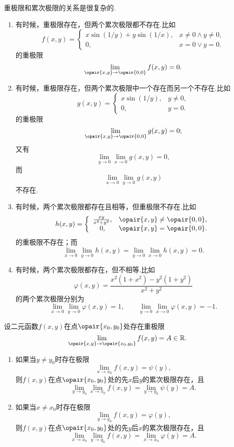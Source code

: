 \begin{example}
重极限和累次极限的关系是很复杂的.
\begin{enumerate}
\item 有时候，重极限存在，但两个累次极限都不存在.比如\[
f(x,y) = \left\{ \begin{array}{cl}
x \sin(1/y) + y \sin(1/x), & x\neq0 \land y\neq0, \\
0, & x=0 \lor y=0.
\end{array} \right.
\]的重极限\[
\lim\limits_{\opair{x,y}\to\opair{0,0}} f(x,y) = 0.
\]

\item 有时候，重极限存在，但两个累次极限中一个存在而另一个不存在.比如\[
g(x,y) = \left\{ \begin{array}{cl}
x \sin(1/y), & y\neq0, \\
0, & y=0.
\end{array} \right.
\]的重极限\[
\lim\limits_{\opair{x,y}\to\opair{0,0}} g(x,y) = 0;
\]又有\[
\lim\limits_{y\to0} \lim\limits_{x\to0} g(x,y) = 0,
\]而\[
\lim\limits_{x\to0} \lim\limits_{y\to0} g(x,y)
\]不存在.

\item 有时候，两个累次极限都存在且相等，但重极限不存在.比如\[
h(x,y) = \left\{ \begin{array}{cl}
\frac{xy}{x^2+y^2}, & \opair{x,y}\neq\opair{0,0}, \\
0, & \opair{x,y}=\opair{0,0}.
\end{array} \right.
\]的重极限不存在；而\[
\lim\limits_{x\to0} \lim\limits_{y\to0} h(x,y)
= \lim\limits_{y\to0} \lim\limits_{x\to0} h(x,y) = 0.
\]

\item 有时候，两个累次极限都存在，但不相等.比如\[
\varphi(x,y) = \frac{x^2(1+x^2) - y^2(1+y^2)}{x^2+y^2}
\]的两个累次极限分别为\[
\lim\limits_{x\to0} \lim\limits_{y\to0} \varphi(x,y) = 1,
\qquad
\lim\limits_{y\to0} \lim\limits_{x\to0} \varphi(x,y) = -1.
\]
\end{enumerate}
\end{example}

\begin{theorem}
设二元函数\(f(x,y)\)在点\(\opair{x_0,y_0}\)处存在重极限\[
\lim\limits_{\opair{x,y}\to\opair{x_0,y_0}} f(x,y) = A \in \mathbb{R}.
\]\begin{enumerate}
\item 如果当\(y \neq y_0\)时存在极限\[
\lim\limits_{x \to x_0} f(x,y) = \psi(y),
\]则\(f(x,y)\)在点\(\opair{x_0,y_0}\)处的先\(x\)后\(y\)的累次极限存在，且\[
\lim\limits_{y \to y_0} \lim\limits_{x \to x_0} f(x,y)
= \lim\limits_{y \to y_0} \psi(y) = A.
\]

\item 如果当\(x \neq x_0\)时存在极限\[
\lim\limits_{y \to y_0} f(x,y) = \varphi(y),
\]则\(f(x,y)\)在点\(\opair{x_0,y_0}\)处的先\(y\)后\(x\)的累次极限存在，且\[
\lim\limits_{x \to x_0} \lim\limits_{y \to y_0} f(x,y)
= \lim\limits_{x \to x_0} \varphi(y) = A.
\]
\end{enumerate}
\end{theorem}

